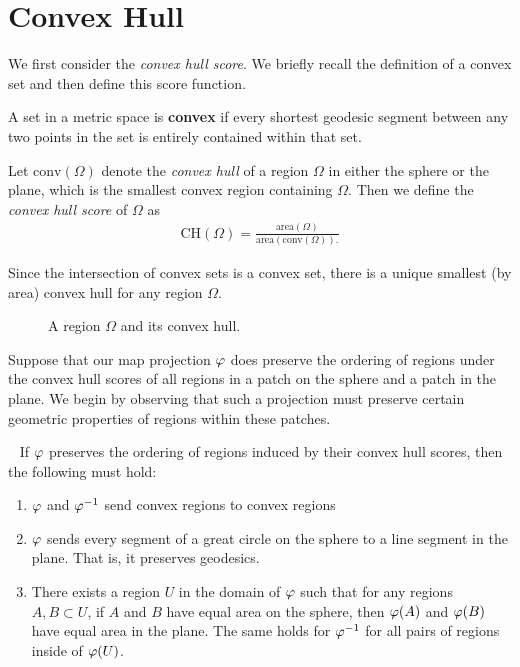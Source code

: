 \section{Convex Hull}\label{sec:ch}
We first consider the \textit{convex hull
score}.  We briefly recall the definition of a convex set and then
define this score function.


\begin{definition}
	A set in a metric space is \textbf{convex} if every shortest geodesic segment between any two points in the set is entirely 
	contained within that set.
\end{definition}





\begin{definition}
  Let $\mathrm{conv}(\Omega)$ denote the \textit{convex hull} of
  a region $\Omega$ in either the sphere or the plane, which is the
  smallest convex region containing $\Omega$.  Then we define the
  \textit{convex hull score} of $\Omega$ as 
  \begin{align*}
    \mathrm{CH}(\Omega)=
    \frac{\mathrm{area}(\Omega)}{\mathrm{area}(\mathrm{conv}(\Omega)).}
  \end{align*}
  
  Since the intersection of convex sets is a convex set, there is a unique smallest (by area) convex hull for any region $\Omega$.
\end{definition}



\begin{figure}[htb]
	\centering
	
	\caption{A region $\Omega$ and its convex hull.}
	\label{fig:ch_example}
\end{figure}

Suppose that our map projection $\varphi$ does  preserve the ordering of regions under the convex hull scores of all regions in a patch on the sphere and a patch in the plane.  We begin by observing that such a projection must preserve certain geometric properties of regions within these patches.
\begin{lemma}~\label{lem:CH_prep}
	If $\varphi$ preserves the ordering of regions induced by their convex hull scores, then the following must 
	hold:
	\begin{enumerate}
		\item $\varphi$ and $\varphi^{-1}$ send convex regions to convex regions
		\item $\varphi$ sends every segment of a great circle on the sphere to a line segment in the plane.  That is, it preserves geodesics.
		\item There exists a region $U$ in the domain of $\varphi$
		such that for any regions $A,B\subset U$, if 
		$A$ and $B$ have equal area on the sphere, then 
		$\varphi(A)$ and $\varphi(B)$ have equal area in the plane.  The same holds 
		for $\varphi^{-1}$ for all pairs of regions inside of $\varphi(U)$.
	\end{enumerate}
\end{lemma}


